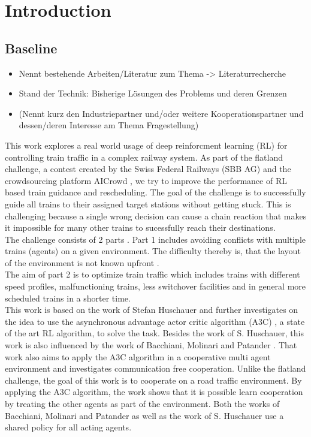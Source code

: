 \chapter{Introduction}\label{chap.einleitung}
\section{Baseline}\label{baseline}
\begin{itemize}
\item Nennt bestehende Arbeiten/Literatur zum Thema -> Literaturrecherche
\item Stand der Technik: Bisherige Lösungen des Problems und deren Grenzen
\item (Nennt kurz den Industriepartner und/oder weitere Kooperationspartner und dessen/deren Interesse am Thema Fragestellung)
\end{itemize}
This work explores a real world usage of deep reinforcment learning (RL) for controlling train traffic in a complex railway system.
As part of the flatland challenge, a contest created by the Swiss Federal Railways (SBB AG) and the crowdsourcing platform AICrowd \cite{aicrowd}, we try to improve the performance of RL based train guidance and rescheduling. The goal of the challenge is to successfully guide all trains to their assigned target stations without getting stuck. This is challenging because a single wrong decision can cause a chain reaction that makes it impossible for many other trains to sucessfully reach their destinations.\\
The challenge consists of 2 parts \cite{aicrowd}.  
Part 1 includes avoiding conflicts with multiple trains (agents) on a given environment. The difficulty thereby is, that the layout of the environment is not known upfront .\\
The aim of part 2 is to optimize train traffic which includes trains with different speed profiles, malfunctioning trains, less switchover facilities and in general more scheduled trains in a shorter time.\\
This work is based on the work of Stefan Huschauer \cite{flatlandstephan} and further investigates on the idea to use the asynchronous advantage actor critic algorithm (A3C) \cite{a3c}, a state of the art RL algorithm, to solve the task.
Besides the work of S. Huschauer, this work is also influenced by the work of Bacchiani, Molinari and Patander \cite{marltraffica3c}. That work also aims to apply the A3C algorithm in a cooperative multi agent environment and investigates communication free cooperation.
Unlike the flatland challenge, the goal of this work is to cooperate on a road traffic environment. By applying the A3C algorithm, the work shows that it is possible learn cooperation by treating the other agents as part of the environment. Both the works of Bacchiani, Molinari and Patander as well as the work of S. Huschauer use a shared policy for all acting agents.

